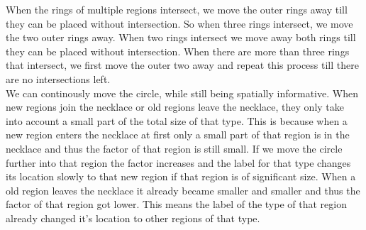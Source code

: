 \documentclass[a4paper,11pt]{article}
\begin{document}
When the rings of multiple regions intersect, we move the outer rings away till they can be placed without intersection.
So when three rings intersect, we move the two outer rings away. 
When two rings intersect we move away both rings till they can be placed without intersection. 
When there are more than three rings that intersect, we first move the outer two away and repeat this process till there are no intersections left. \\

We can continously move the circle, while still being spatially informative. 
When new regions join the necklace or old regions leave the necklace, they only take into account a small part of the total size of that type. 
This is because when a new region enters the necklace at first only a small part of that region is in the necklace and thus the factor of that region is still small. 
If we move the circle further into that region the factor increases and the label for that type changes its location slowly to that new region if that region is of significant size. 
When a old region leaves the necklace it already became smaller and smaller and thus the factor of that region got lower. 
This means the label of the type of that region already changed it's location to other regions of that type. 
\end{document}
